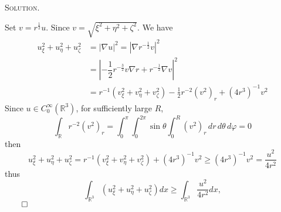 \documentclass[12pt, a4paper, oneside]{ctexart}
\newenvironment{solution}{%
	\par\noindent\textsc{Solution. }\ignorespaces
}{%
	\hfill$\qed$\par
}
\begin{document}
	\begin{solution}
		Set $v = r^{\frac{1}{2}}u$. Since $v = \sqrt{\xi^{2}+\eta^{2}+\zeta^{2}}$. We have \[ \begin{aligned}
			u_\xi^2 + u_\eta^2 + u_\zeta^2 & = |\nabla u|^{2} = |\nabla r^{-\frac{1}{2}}v|^{2}\\&=|-\dfrac{1}{2}r^{-\frac{3}{2}}v\nabla r + r^{-\frac{1}{2}}\nabla v|^{2}\\&=r^{-1}(v_{\xi}^{2}+v_{\eta}^{2}+v_{\zeta}^{2}) - \frac{1}{2}r^{-2}(v^{2})_{r} + (4r^{3})^{-1}v^{2}
		\end{aligned} \]Since $u\in C_{0}^{\infty}(\mathbb{R}^{3}) $, for sufficiently large $R$, \[ \int_{\mathbb{R}}r^{-2}(v^{2})_{r} = \int_{0}^{\pi}\int_{0}^{2\pi}\sin\theta\int_{0}^{R}(v^{2})_{r}\, dr\, d\theta\, d\varphi = 0 \]
		then \[ u_\xi^2 + u_\eta^2 + u_\zeta^2 = r^{-1}(v_{\xi}^{2}+v_{\eta}^{2}+v_{\zeta}^{2})  + (4r^{3})^{-1}v^{2}\geq (4r^{3})^{-1}v^{2} = \dfrac{u^{2}}{4r^{2}}  \]thus \[
		\int_{\mathbb{R}^3} \left( u_\xi^2 + u_\eta^2 + u_\zeta^2 \right) dx \geq \int_{\mathbb{R}^3} \frac{u^2}{4r^2} dx,
		\]
	\end{solution}
\end{document}

